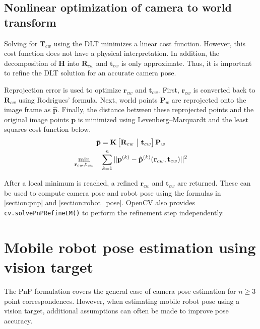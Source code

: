 \documentclass{article}
\makeatletter
\newcommand{\onebytwo}[2]{\ensuremath{\left[\begin{array}{@{}c|c@{}} #1 & #2 \end{array}\right]}}
\makeatother
\begin{document}
\subsection{Nonlinear optimization of camera to world transform}
\label{section:nonlinear_optimization}

Solving for $\mathbf{T}_{cw}$ using the DLT minimizes a linear cost function. However, this cost function does not have a physical interpretation. In addition, the decomposition of $\mathbf{H}$ into $\mathbf{R}_{cw}$ and $\mathbf{t}_{cw}$ is only approximate. Thus, it is important to refine the DLT solution for an accurate camera pose.

Reprojection error is used to optimize $\mathbf{r}_{cw}$ and $\mathbf{t}_{cw}$. First, $\mathbf{r}_{cw}$ is converted back to $\mathbf{R}_{cw}$ using Rodrigues' formula. Next, world points $\mathbf{P}_w$ are reprojected onto the image frame as $\mathbf{\hat{p}}$. Finally, the distance between these reprojected points and the original image points $\mathbf{p}$ is minimized using Levenberg–Marquardt and the least squares cost function below.
\begin{gather*}
    \hat{\mathbf{p}}=\mathbf{K}\onebytwo{\mathbf{R}_{cw}}{\mathbf{t}_{cw}}\mathbf{P}_w \\
    \min_{\mathbf{r}_{cw},\mathbf{t}_{cw}} \quad \sum_{k=1}^{n}{||\mathbf{p}^{(k)}-\mathbf{\hat{p}}^{(k)}(\mathbf{r}_{cw},\mathbf{t}_{cw})||^2}
\end{gather*}

After a local minimum is reached, a refined $\mathbf{r}_{cw}$ and $\mathbf{t}_{cw}$ are returned. These can be used to compute camera pose and robot pose using the formulas in \ref{section:pnp} and \ref{section:robot_pose}. OpenCV also provides \verb|cv.solvePnPRefineLM()| to perform the refinement step independently.

\section{Mobile robot pose estimation using vision target}
The PnP formulation covers the general case of camera pose estimation for $n \geq 3$ point correspondences. However, when estimating mobile robot pose using a vision target, additional assumptions can often be made to improve pose accuracy.
\end{document}
